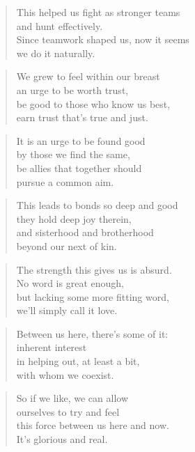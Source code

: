 \documentclass[14pt,a4paper]{article}
\begin{document}
\begin{verse}
This helped us fight as stronger teams\\
and hunt effectively.\\
Since teamwork shaped us, now it seems\\
we do it naturally.
\end{verse}

\begin{verse}
We grew to feel within our breast\\
an urge to be worth trust,\\
be good to those who know us best,\\
earn trust that’s true and just.
\end{verse}

\begin{verse}
It is an urge to be found good\\
by those we find the same,\\
be allies that together should\\
pursue a common aim.
\end{verse}

\begin{verse}
This leads to bonds so deep and good\\
they hold deep joy therein,\\
and sisterhood and brotherhood\\
beyond our next of kin.
\end{verse}

\begin{verse}
The strength this gives us is absurd.\\
No word is great enough,\\
but lacking some more fitting word,\\
we’ll simply call it love.
\end{verse}

\begin{verse}
Between us here, there’s some of it:\\
inherent interest\\
in helping out, at least a bit,\\
with whom we coexist.
\end{verse}

\begin{verse}
So if we like, we can allow\\
ourselves to try and feel\\
this force between us here and now.\\
It’s glorious and real.
\end{verse}
\end{document}
